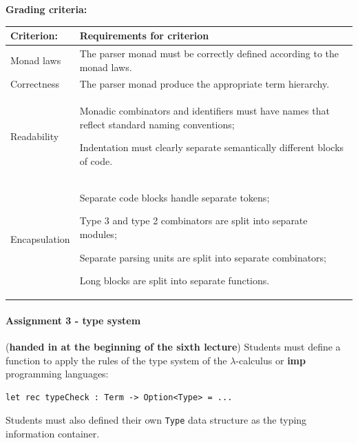\documentclass[a4paper, 10pt]{article}
\begin{document}
			\textbf{Grading criteria:} \\
				\begin{tabularx}{\textwidth}{|>{\columncolor{lichtGrijs}} X | p{}|}
					\hline
					\textbf{Criterion:} & \textbf{Requirements for criterion} \\
					\hline
					Monad laws & The parser monad must be correctly defined according to the monad laws. \\
					\hline
					Correctness & The parser monad produce the appropriate term hierarchy. \\
					\hline
					Readability & 
						\begin{inparaenum}
							\item Monadic combinators and identifiers must have names that reflect standard naming conventions;
							\item Indentation must clearly separate semantically different blocks of code.
						\end{inparaenum} \\
					\hline
					Encapsulation & 
						\begin{inparaenum}
							\item Separate code blocks handle separate tokens;
							\item Type 3 and type 2 combinators are split into separate modules;
							\item Separate parsing units are split into separate combinators;
							\item Long blocks are split into separate functions.
						\end{inparaenum} \\
					\hline
				\end{tabularx}			

		\paragraph*{Assignment 3 - type system} (\textbf{handed in at the beginning of the sixth lecture})
			Students must define a function to apply the rules of the type system of the $\lambda$-calculus or \textbf{imp} programming languages:

			\begin{lstlisting}
let rec typeCheck : Term -> Option<Type> = ...
			\end{lstlisting}

			Students must also defined their own \texttt{Type} data structure as the typing information container.
\end{document}

